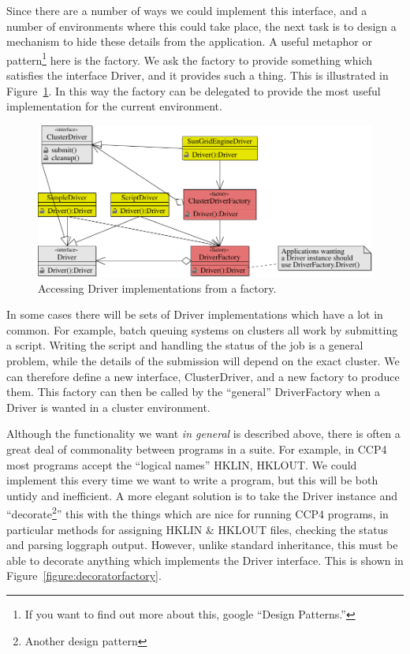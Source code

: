 \documentclass[a4paper, 11pt]{article}
\begin{document}
Since there are a number of ways we could implement this interface, and a
number of environments where this could take place, the next task is
to design a mechanism to hide these details from the application. A
useful metaphor or pattern\footnote{If you want to find out more about this,
google ``Design Patterns.''} here is the factory. We ask the factory to 
provide something which satisfies the interface Driver, and it provides
such a thing.
This is illustrated in Figure~\ref{figure:driverfactory}. In this way the 
factory can be delegated to provide the most useful implementation for the
current environment.

\begin{figure}
\centerline{
\includegraphics[scale=0.667]{UML/Driver-1.pdf}
}
\caption{Accessing Driver implementations from a factory.}
\label{figure:driverfactory}
\end{figure}

In some cases there will be sets of Driver implementations which have a 
lot in common. For example, batch queuing systems on clusters all work by
submitting  a script. Writing the script and handling the status of the 
job is a general problem, while the details of the submission will depend
on the exact cluster. We can therefore define a new interface, ClusterDriver,
and a new factory to produce them. This factory can then be called by the 
``general'' DriverFactory when a Driver is wanted in a cluster environment.

Although the functionality we want \emph{in general} is described above,
there is often a great deal of commonality between programs in a suite.
For example, in CCP4 most programs accept the ``logical names'' HKLIN, HKLOUT.
We could implement this every time we want to write a program, but this 
will be both untidy and inefficient. A more elegant solution is to take
the Driver instance and ``decorate\footnote{Another design pattern}''
this with the things which are nice for running CCP4 programs, in particular
methods for assigning HKLIN \& HKLOUT files, checking the status and parsing
loggraph output. However, unlike standard inheritance, this must be able
to decorate anything which implements the Driver interface. This is shown
in Figure~\ref{figure:decoratorfactory}.
\end{document}
